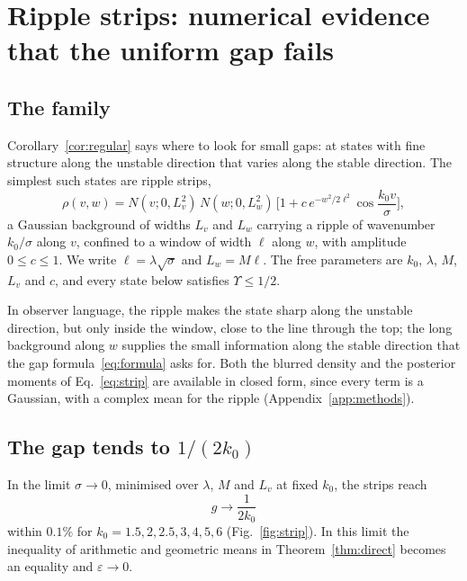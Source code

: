 \section{Ripple strips: numerical evidence that the uniform gap fails}
\label{sec:strips}

\subsection{The family}

Corollary~\ref{cor:regular} says where to look for small gaps: at states with fine structure along the unstable direction that varies along the stable direction. The simplest such states are ripple strips,
\begin{equation}
\rho(v,w) = N(v;0,L_v^2)\,N(w;0,L_w^2)\,\Big[1 + c\,e^{-w^2/2\ell^2}\cos\frac{k_0 v}{\sigma}\Big],
\label{eq:strip}
\end{equation}
a Gaussian background of widths $L_v$ and $L_w$ carrying a ripple of wavenumber $k_0/\sigma$ along $v$, confined to a window of width $\ell$ along $w$, with amplitude $0 \leq c \leq 1$. We write $\ell = \lambda\sqrt\sigma$ and $L_w = M\ell$. The free parameters are $k_0$, $\lambda$, $M$, $L_v$ and $c$, and every state below satisfies $\Upsilon \leq 1/2$.

In observer language, the ripple makes the state sharp along the unstable direction, but only inside the window, close to the line through the top; the long background along $w$ supplies the small information along the stable direction that the gap formula~\eqref{eq:formula} asks for. Both the blurred density and the posterior moments of Eq.~\eqref{eq:strip} are available in closed form, since every term is a Gaussian, with a complex mean for the ripple (Appendix~\ref{app:methods}).

\subsection{The gap tends to $1/(2k_0)$}

\begin{observation}
\label{obs:limit}
In the limit $\sigma\to 0$, minimised over $\lambda$, $M$ and $L_v$ at fixed $k_0$, the strips reach
\begin{equation}
g \to \frac{1}{2k_0}
\end{equation}
within $0.1\%$ for $k_0 = 1.5, 2, 2.5, 3, 4, 5, 6$ (Fig.~\ref{fig:strip}). In this limit the inequality of arithmetic and geometric means in Theorem~\ref{thm:direct} becomes an equality and $\varepsilon \to 0$.
\end{observation}

